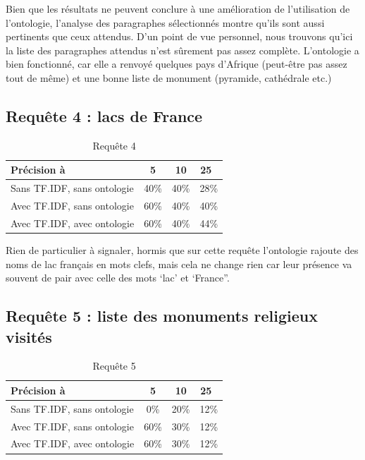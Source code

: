 \documentclass{article}
\begin{document}
Bien que les résultats ne peuvent conclure à une amélioration de l’utilisation de
l’ontologie, l’analyse des paragraphes sélectionnés montre qu’ils sont aussi
pertinents que ceux attendus.  D'un point de vue personnel, nous trouvons qu’ici la
liste des paragraphes attendus n’est sûrement pas assez complète. L’ontologie a bien
fonctionné, car elle a renvoyé quelques pays d’Afrique (peut-être pas assez tout de
même) et une bonne liste de monument (pyramide, cathédrale etc.)

\subsection{Requête 4 : \og lacs de France \fg }

\begin{table}[H]
    \centering
    \caption{Requête 4}
\begin{tabular}{|l|c|c|c|}
    \hline
    Précision à & 5 & 10 & 25 \\
    \hline
    Sans TF.IDF, sans ontologie & 40\% & 40\% & 28\% \\
    \hline
    Avec TF.IDF, sans ontologie & 60\% & 40\% & 40\% \\
    \hline
    Avec TF.IDF, avec ontologie & 60\% & 40\% & 44\% \\
    \hline
\end{tabular}
\end{table}

Rien de particulier à signaler, hormis que sur cette requête l’ontologie rajoute des
noms de lac français en mots clefs, mais cela ne change rien car leur présence va
souvent de pair avec celle des mots ‘lac’ et ‘France”.

\subsection{Requête 5 : \og liste des monuments religieux visités \fg }

\begin{table}[H]
    \centering
    \caption{Requête 5}
\begin{tabular}{|l|c|c|c|}
    \hline
    Précision à & 5 & 10 & 25 \\
    \hline
    Sans TF.IDF, sans ontologie & 0\% &   20\% &  12\% \\
    \hline
    Avec TF.IDF, sans ontologie & 60\% & 30\% &  12\% \\
    \hline
    Avec TF.IDF, avec ontologie & 60\% & 30\% &  12\% \\
    \hline
\end{tabular}
\end{table}
\end{document}
